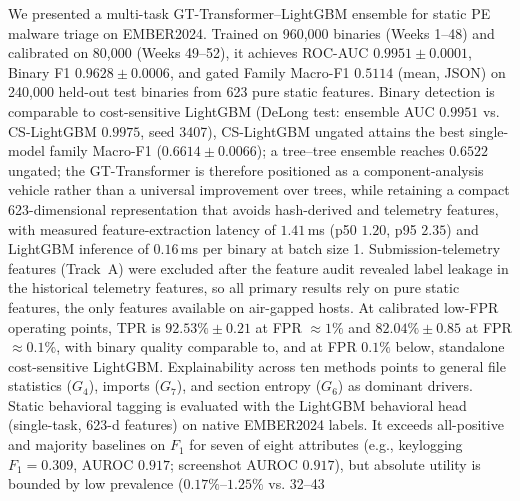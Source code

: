 \documentclass[Number]{sn-jnl}
\begin{document}
We presented a multi-task GT-Transformer--LightGBM ensemble for static PE malware triage on EMBER2024. Trained on 960{,}000 binaries (Weeks 1--48) and calibrated on 80{,}000 (Weeks 49--52), it achieves ROC-AUC $0.9951\pm0.0001$, Binary F1 $0.9628\pm0.0006$, and gated Family Macro-F1 $0.5114$ (mean, JSON) on 240{,}000 held-out test binaries from 623 pure static features. Binary detection is comparable to cost-sensitive LightGBM (DeLong test: ensemble AUC $0.9951$ vs. CS-LightGBM $0.9975$, seed 3407), CS-LightGBM ungated attains the best single-model family Macro-F1 ($0.6614\pm0.0066$); a tree--tree ensemble reaches $0.6522$ ungated; the GT-Transformer is therefore positioned as a component-analysis vehicle rather than a universal improvement over trees, while retaining a compact 623-dimensional representation that avoids hash-derived and telemetry features, with measured feature-extraction latency of $1.41$\,ms (p50 $1.20$, p95 $2.35$) and LightGBM inference of $0.16$\,ms per binary at batch size 1. Submission-telemetry features (Track~A) were excluded after the feature audit revealed label leakage in the historical telemetry features, so all primary results rely on pure static features, the only features available on air-gapped hosts. At calibrated low-FPR operating points, TPR is $92.53\%\pm0.21$ at FPR $\approx1\%$ and $82.04\%\pm0.85$ at FPR $\approx0.1\%$, with binary quality comparable to, and at FPR $0.1\%$ below, standalone cost-sensitive LightGBM. Explainability across ten methods points to general file statistics ($G_4$), imports ($G_7$), and section entropy ($G_6$) as dominant drivers. Static behavioral tagging is evaluated with the LightGBM behavioral head (single-task, 623-d features) on native EMBER2024 labels. It exceeds all-positive and majority baselines on $F_1$ for seven of eight attributes (e.g., keylogging $F_1=0.309$, AUROC $0.917$; screenshot AUROC $0.917$), but absolute utility is bounded by low prevalence ($0.17\%$--$1.25\%$ vs. 32--43%


\end{document}
